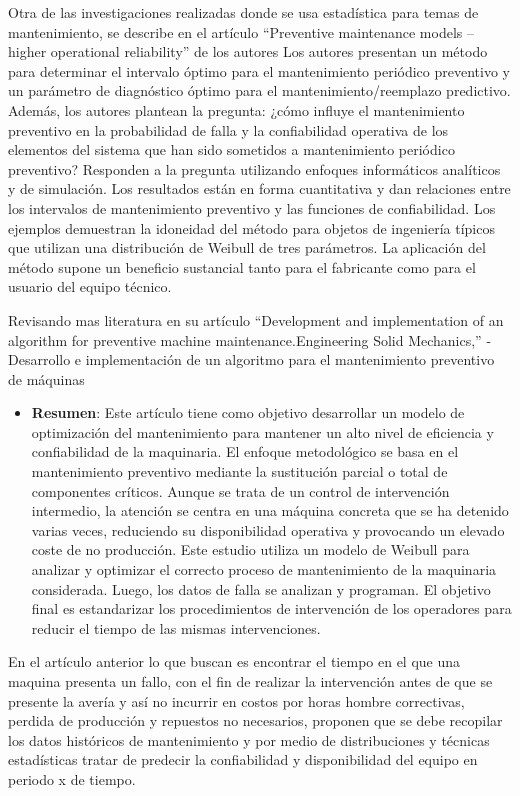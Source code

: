 \documentclass[
  11pt,
  bookmarksnumbered]{article}
\providecommand{\tightlist}{%
  \setlength{\itemsep}{0pt}\setlength{\parskip}{0pt}}
\begin{document}
Otra de las investigaciones realizadas donde se usa estadística para temas de mantenimiento, se describe en el artículo ``Preventive maintenance models -- higher operational reliability'' de los autores \textcite{Legat2017} Los autores presentan un método para determinar el intervalo óptimo para el mantenimiento periódico preventivo y un parámetro de diagnóstico óptimo para el mantenimiento/reemplazo predictivo.
Además, los autores plantean la pregunta: ¿cómo influye el mantenimiento preventivo en la probabilidad de falla y la confiabilidad operativa de los elementos del sistema que han sido sometidos a mantenimiento periódico preventivo?
Responden a la pregunta utilizando enfoques informáticos analíticos y de simulación.
Los resultados están en forma cuantitativa y dan relaciones entre los intervalos de mantenimiento preventivo y las funciones de confiabilidad.
Los ejemplos demuestran la idoneidad del método para objetos de ingeniería típicos que utilizan una distribución de Weibull de tres parámetros.
La aplicación del método supone un beneficio sustancial tanto para el fabricante como para el usuario del equipo técnico.

Revisando mas literatura \textcite{Nardo2021} en su artículo ``Development and implementation of an algorithm for preventive machine maintenance.Engineering Solid Mechanics,'' - Desarrollo e implementación de un algoritmo para el mantenimiento preventivo de máquinas

\begin{itemize}
\tightlist
\item
  \textbf{Resumen}: Este artículo tiene como objetivo desarrollar un modelo de optimización del mantenimiento para mantener un alto nivel de eficiencia y confiabilidad de la maquinaria. El enfoque metodológico se basa en el mantenimiento preventivo mediante la sustitución parcial o total de componentes críticos. Aunque se trata de un control de intervención intermedio, la atención se centra en una máquina concreta que se ha detenido varias veces, reduciendo su disponibilidad operativa y provocando un elevado coste de no producción. Este estudio utiliza un modelo de Weibull para analizar y optimizar el correcto proceso de mantenimiento de la maquinaria considerada. Luego, los datos de falla se analizan y programan. El objetivo final es estandarizar los procedimientos de intervención de los operadores para reducir el tiempo de las mismas intervenciones.
\end{itemize}

En el artículo anterior lo que buscan es encontrar el tiempo en el que una maquina presenta un fallo, con el fin de realizar la intervención antes de que se presente la avería y así no incurrir en costos por horas hombre correctivas, perdida de producción y repuestos no necesarios, proponen que se debe recopilar los datos históricos de mantenimiento y por medio de distribuciones y técnicas estadísticas tratar de predecir la confiabilidad y disponibilidad del equipo en periodo x de tiempo.
\end{document}

